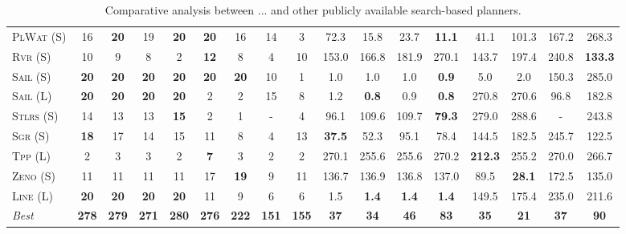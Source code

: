 \documentclass[11pt]{article}
\begin{document}
\begin{table}[tb]
{\begin{tabular}{|l||cccccccc||cccccccc||}
\textsc{PlWat} (S)&16&\textbf{20}&19&\textbf{20}&\textbf{20}&16&14&3&72.3&15.8&23.7&\textbf{11.1}&41.1&101.3&167.2&268.3\\
\textsc{Rvr} (S)&10&9&8&2&\textbf{12}&8&4&10&153.0&166.8&181.9&270.1&143.7&197.4&240.8&\textbf{133.3}\\
\textsc{Sail} (S)&\textbf{20}&\textbf{20}&\textbf{20}&\textbf{20}&\textbf{20}&\textbf{20}&10&1&1.0&1.0&1.0&\textbf{0.9}&5.0&2.0&150.3&285.0\\
\textsc{Sail} (L)&\textbf{20}&\textbf{20}&\textbf{20}&\textbf{20}&2&2&15&8&1.2&\textbf{0.8}&0.9&\textbf{0.8}&270.8&270.6&96.8&182.8\\
\textsc{Stlrs} (S)&14&13&13&\textbf{15}&2&1&-&4&96.1&109.6&109.7&\textbf{79.3}&279.0&288.6&-&243.8\\
\textsc{Sgr} (S)&\textbf{18}&17&14&15&11&8&4&13&\textbf{37.5}&52.3&95.1&78.4&144.5&182.5&245.7&122.5\\
\textsc{Tpp} (L)&2&3&3&2&\textbf{7}&3&2&2&270.1&255.6&255.6&270.2&\textbf{212.3}&255.2&270.0&266.7\\
\textsc{Zeno} (S)&11&11&11&11&17&\textbf{19}&9&11&136.7&136.9&136.8&137.0&89.5&\textbf{28.1}&172.5&135.0\\
\textsc{Line} (L)&\textbf{20}&\textbf{20}&\textbf{20}&\textbf{20}&11&9&6&6&1.5&\textbf{1.4}&\textbf{1.4}&\textbf{1.4}&149.5&175.4&235.0&211.6
\\\hline
\textit{Best}&\textbf{278}&\textbf{279}&\textbf{271}&\textbf{280}&\textbf{276}&\textbf{222}&\textbf{151}&\textbf{155}&\textbf{37}&\textbf{34}&\textbf{46}&\textbf{83}&\textbf{35}&\textbf{21}&\textbf{37}&\textbf{90}\\\hline

        \end{tabular}}
        \caption{Comparative analysis between ... and other publicly available search-based planners.}
        \label{tab:search}
        \end{table}
        
\end{document}
